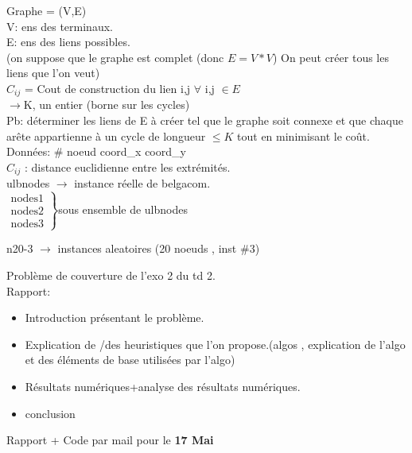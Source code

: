 \documentclass[frenchb]{article}
\begin{document}
				Graphe = (V,E) \\
				V: ens des terminaux.\\
				E: ens des liens possibles.\\
				(on suppose que le graphe est complet (donc $E=V*V$) On peut créer tous les liens que l'on veut)\\
				
				$C_{ij}$ = Cout de construction du lien i,j $\forall $ i,j $\in E $\\
				
				$\rightarrow $K, un entier (borne sur les cycles)\\
				
				Pb: déterminer les liens de E à créer tel que le graphe soit connexe et que chaque arête appartienne à un cycle de longueur $\le K$ tout en minimisant le coût.\\
				
				
				
				Données: \# noeud coord\_x  coord\_y\\
				
				$C_{ij}$ : distance euclidienne entre les extrémités.\\
				
				ulbnodes $\rightarrow$ instance réelle de belgacom.\\
				
				
				$
				\left.
				\begin{array}{l}
					\mbox{nodes1}\\
					\mbox{nodes2}\\
					\mbox{nodes3}
				\end{array}
				\right \}$sous ensemble de ulbnodes 
				
				
				n20-3 $\rightarrow$ instances aleatoires (20 noeuds , inst \#3)
				
				
				
				Problème de couverture de l'exo 2 du td 2.\\
				Rapport: 
				\begin{itemize}
					\item Introduction présentant le problème.\\
					\item Explication de /des heuristiques que l'on propose.(algos , explication de l'algo et des éléments de base utilisées par l'algo)\\
					\item Résultats numériques+analyse des résultats numériques.
					\item conclusion
				\end{itemize}
				Rapport + Code par mail pour le \textbf{17 Mai}
				
				
				
			
\end{document}
